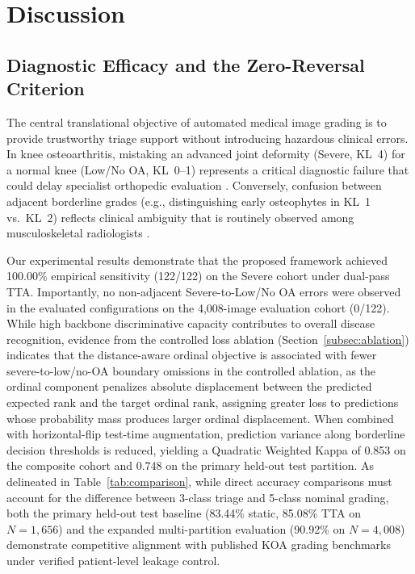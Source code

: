 \documentclass[10pt,journal]{IEEEtran}
\begin{document}
\section{Discussion}
\label{sec:discussion}

\subsection{Diagnostic Efficacy and the Zero-Reversal Criterion}
\label{subsec:clinical_efficacy}

The central translational objective of automated medical image grading is to provide trustworthy triage support without introducing hazardous clinical errors. In knee osteoarthritis, mistaking an advanced joint deformity (Severe, KL~4) for a normal knee (Low/No OA, KL~0--1) represents a critical diagnostic failure that could delay specialist orthopedic evaluation \cite{carr2012knee}. Conversely, confusion between adjacent borderline grades (e.g., distinguishing early osteophytes in KL~1 vs.\ KL~2) reflects clinical ambiguity that is routinely observed among musculoskeletal radiologists \cite{sheehy2015validity}.

Our experimental results demonstrate that the proposed framework achieved 100.00\% empirical sensitivity (122/122) on the Severe cohort under dual-pass TTA. Importantly, no non-adjacent Severe-to-Low/No OA errors were observed in the evaluated configurations on the 4,008-image evaluation cohort (0/122). While high backbone discriminative capacity contributes to overall disease recognition, evidence from the controlled loss ablation (Section~\ref{subsec:ablation}) indicates that the distance-aware ordinal objective is associated with fewer severe-to-low/no-OA boundary omissions in the controlled ablation, as the ordinal component penalizes absolute displacement between the predicted expected rank and the target ordinal rank, assigning greater loss to predictions whose probability mass produces larger ordinal displacement. When combined with horizontal-flip test-time augmentation, prediction variance along borderline decision thresholds is reduced, yielding a Quadratic Weighted Kappa of 0.853 on the composite cohort and 0.748 on the primary held-out test partition. As delineated in Table~\ref{tab:comparison}, while direct accuracy comparisons must account for the difference between 3-class triage and 5-class nominal grading, both the primary held-out test baseline (83.44\% static, 85.08\% TTA on $N = 1{,}656$) and the expanded multi-partition evaluation (90.92\% on $N = 4{,}008$) demonstrate competitive alignment with published KOA grading benchmarks under verified patient-level leakage control.
\end{document}
